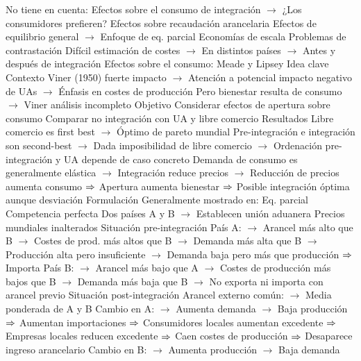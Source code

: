 \documentclass{nuevotema}
\begin{document}
\begin{esquemal}
				\4 No tiene en cuenta:
				\4[] Efectos sobre el consumo de integración
				\4[] $\to$ ¿Los consumidores prefieren?
				\4[] Efectos sobre recaudación arancelaria
				\4[] Efectos de equilibrio general
				\4[] $\to$ Enfoque de eq. parcial
				\4[] Economías de escala
				\4 Problemas de contrastación
				\4[] Difícil estimación de costes
				\4[] $\to$ En distintos países
				\4[] $\to$ Antes y después de integración
		\2 Efectos sobre el consumo: Meade y Lipsey
			\3 Idea clave
				\4 Contexto
				\4[] Viner (1950) fuerte impacto
				\4[] $\to$ Atención a potencial impacto negativo de UAs
				\4[] $\to$ Énfasis en costes de producción
				\4[] Pero bienestar resulta de consumo
				\4[] $\to$ Viner análisis incompleto
				\4 Objetivo
				\4[] Considerar efectos de apertura sobre consumo
				\4[] Comparar no integración con UA y libre comercio
				\4 Resultados
				\4[] Libre comercio es first best
				\4[] $\to$ Óptimo de pareto mundial
				\4[] Pre-integración e integración son second-best
				\4[] $\to$ Dada imposibilidad de libre comercio
				\4[] $\to$ Ordenación pre-integración y UA depende de caso concreto
				\4[] Demanda de consumo es generalmente elástica
				\4[] $\to$ Integración reduce precios
				\4[] $\to$ Reducción de precios aumenta consumo
				\4[] $\Rightarrow$ Apertura aumenta bienestar
				\4[] $\Rightarrow$ Posible integración óptima aunque desviación
			\3 Formulación
				\4 Generalmente mostrado en:
				\4[] Eq. parcial
				\4[] Competencia perfecta
				\4[] Dos países A y B
				\4[] $\to$ Establecen unión aduanera
				\4[] Precios mundiales inalterados
				\4 Situación pre-integración
				\4[] País A:
				\4[] $\to$ Arancel más alto que B
				\4[] $\to$ Costes de prod. más altos que B
				\4[] $\to$ Demanda más alta que B
				\4[] $\to$ Producción alta pero insuficiente
				\4[] $\to$ Demanda baja pero más que producción
				\4[] $\Rightarrow$ Importa
				\4[] País B:
				\4[] $\to$ Arancel más bajo que A
				\4[] $\to$ Costes de producción más bajos que B
				\4[] $\to$ Demanda más baja que B
				\4[] $\to$ No exporta ni importa con arancel previo
				\4 Situación post-integración
				\4[] Arancel externo común:
				\4[] $\to$ Media ponderada de A y B
				\4[] Cambio en A:
				\4[] $\to$ Aumenta demanda
				\4[] $\to$ Baja producción
				\4[] $\Rightarrow$ Aumentan importaciones
				\4[] $\Rightarrow$ Consumidores locales aumentan excedente
				\4[] $\Rightarrow$ Empresas locales reducen excedente
				\4[] $\Rightarrow$ Caen costes de producción
				\4[] $\Rightarrow$ Desaparece ingreso arancelario
				\4[] Cambio en B:
				\4[] $\to$ Aumenta producción
				\4[] $\to$ Baja demanda

\end{esquemal}
\end{document}
